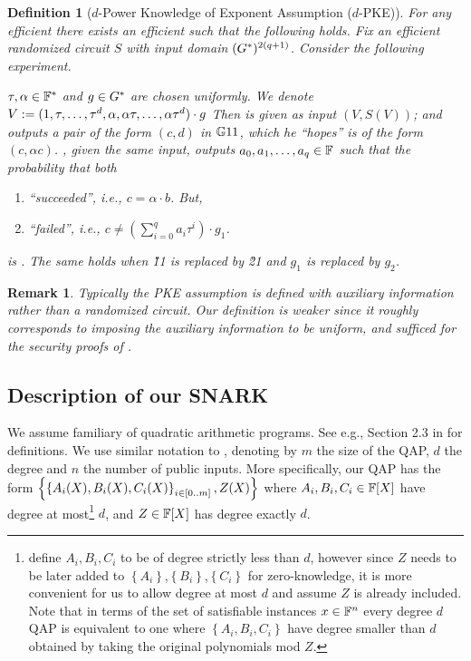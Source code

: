 \documentclass[11pt]{article}
\numberwithin{figure}{section} %
\newtheorem{dfn}[thm]{Definition}
\newtheorem{remark}[thm]{Remark}
\newcommand{\set}[1]{\ensuremath{\left\{#1\right\}}\xspace}
\begin{document}
\begin{dfn}[$d$-Power Knowledge of Exponent Assumption ($d$-PKE)]\label{dfn:koeassumption}
For any efficient \adv there exists an efficient \ext such that the following holds.
Fix an efficient  randomized circuit $S$ with input domain $(G^*)^{2(q+1)}$.
 Consider the following experiment.

 $\tau,\alpha\in \mathbb F^*$ and $g\in G^*$ are chosen uniformly. We denote $V:= (1,\tau,\ldots,\tau^{d},\alpha,\alpha \tau,\ldots,\alpha \tau^{d})\cdot g$
 Then \adv is given as input $(V,S( V))$;
 and outputs a pair of the form $(c,d)$ in ${\mathbb G}11$, which he ``hopes'' is of the form $(c,\alpha c)$.
   \ext, given the same input, outputs  
 $a_0,a_1,\ldots,a_q \in \mathbb F$ such that the probability that both
   
 \begin{enumerate}
  \item \adv ``succeeded'', i.e., $c=\alpha\cdot b$. But,
  \item \ext ``failed'', i.e., $c \neq (\sum_{i=0}^q a_i \tau^i)\cdot g_1$.
   \end{enumerate}
is \neg.
 The same holds when \G11 is replaced by \G21 and $g_1$ is replaced by $g_2$.
\end{dfn}
\begin{remark}
Typically the PKE assumption is defined with auxiliary information rather than a randomized circuit.
Our definition is weaker since it roughly corresponds to imposing the auxiliary information to be uniform,
and sufficed for the security proofs of \cite{GGPR,PHGR}.
\end{remark}
\subsection{Description of our SNARK}\label{subsec:SNARK}
We assume familiary of quadratic arithmetic programs.
See e.g., Section 2.3 in \cite{groth16} for definitions.
We use similar notation to \cite{BCTV}, denoting by $m$ the size of the QAP, $d$ the degree and $n$ the number of public inputs.
More specifically, our QAP has the form \set{\sett{A_i(X),B_i(X),C_i(X)}{i\in [0..m]}, Z(X)}
where $A_i,B_i,C_i\in \mathbb F[X]$ have degree at most\footnote{\cite{BCTV} define $A_i,B_i,C_i$ to be of degree strictly less than $d$, however since $Z$ needs to be later added to \set{A_i},\set{B_i},\set{C_i} for zero-knowledge, it is more convenient for us to allow degree at most $d$ and assume $Z$ is already included. Note that in terms of the set of satisfiable instances $x\in \mathbb F^n$ every degree $d$ QAP is equivalent to one where \set{A_i,B_i,C_i} have degree smaller than $d$ obtained by taking the original polynomials mod $Z$.} $d$, and $Z\in \mathbb F[X]$ has degree exactly $d$.
\end{document}
